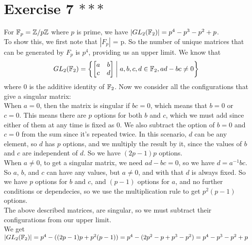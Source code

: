\documentclass[12pt]{article}
\begin{document}
    \section*{Exercise 7 $***$}
    For $\mathbb{F}_p = \mathbb{Z}/p\mathbb{Z}$ where $p$ is prime,
    we have $|GL_2(\mathbb{F}_2)| = p^4 - p^3 - p^2 + p$. \\
    To show this, we first note that $|F_p|$ = p. 
    So the number of unique matrices that can be generated by $F_p$
    is $p^4$, providing us an upper limit.
    We know that
    \[ GL_2(\mathbb{F}_2) = \left\{
        \begin{bmatrix}
            a & b \\
            c & d \\
        \end{bmatrix} 
        \; \middle\vert \;
        a, b, c, d \in \mathbb{F}_2,
        ad - bc \neq 0  
    \right\} \] 
    where 0 is the additive identity of $\mathbb{F}_2$.
    Now we consider all the configurations that give a singular matrix: \\
    When $a = 0$,
    then the matrix is singular if $bc = 0$,
    which means that $b = 0$ or $c = 0$.
    This means there are $p$ options for both $b$ and $c$,
    which we must add since either of them at any time is fixed as 0.
    We also subtract the option of $b = 0$ and $c = 0$ from the sum
    since it's repeated twice.
    In this scenario, $d$ can be any element,
    so $d$ has $p$ options,
    and we multiply the result by it,
    since the values of $b$ and $c$ are independent of $d$.
    So we have $(2p - 1)p$ options. \\
    When $a \neq 0$,
    to get a singular matrix, we need $ad - bc = 0$,
    so we have $d = a^{-1}bc$.
    So $a$, $b$, and $c$ can have any values,
    but $a \neq 0$,
    and with that $d$ is always fixed.
    So we have $p$ options for $b$ and $c$,
    and $(p-1)$ options for $a$,
    and no further conditions or dependecies,
    so we use the multiplication rule to get $p^2(p-1)$ options. \\
    The above described matrices, are singular,
    so we must subtract their configurations from our upper limit. \\
    We get $|GL_2(\mathbb{F}_2)| = p^4 - ((2p - 1)p + p^2(p-1))
    = p^4 - (2p^2 - p + p^3 - p^2)
    = p^4 - p^3 - p^2 + p$
\end{document}
